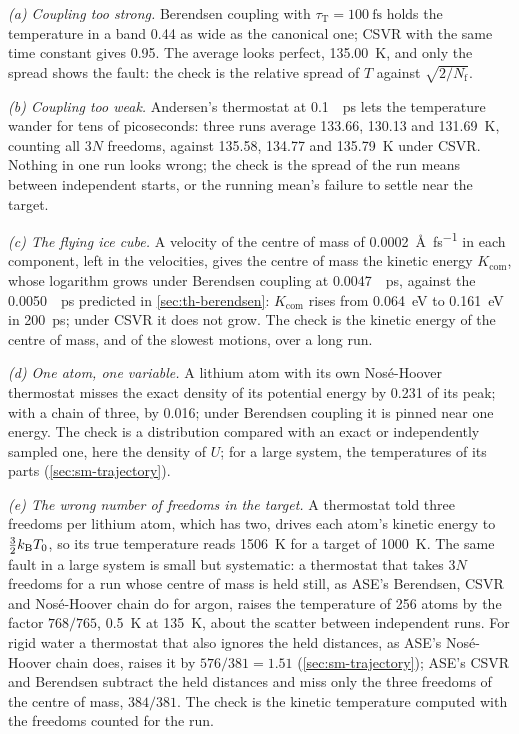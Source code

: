 \emph{(a) Coupling too strong.} Berendsen coupling with $\tau_{\mathrm T} =
\SI{100}{\femto\second}$ holds the temperature in a band 0.44 as wide as
the canonical one; CSVR with the same time constant gives 0.95. The
average looks perfect, \SI{135.00}{\kelvin}, and only the spread shows
the fault: the check is the relative spread of $T$ against
$\sqrt{2/N_{\mathrm f}}$.

\emph{(b) Coupling too weak.} Andersen's thermostat at
\SI{0.1}{\per\pico\second} lets the temperature wander for tens of
picoseconds: three runs average 133.66, 130.13 and
\SI{131.69}{\kelvin}, counting all $3N$ freedoms, against 135.58, 134.77 and \SI{135.79}{\kelvin}
under CSVR. Nothing in one run looks wrong; the check is the spread of
the run means between independent starts, or the running mean's failure
to settle near the target.

\emph{(c) The flying ice cube.} A velocity of the centre of mass of
\SI{0.0002}{\angstrom\per\femto\second} in each component, left in the
velocities, gives the centre of mass the kinetic energy $K_{\mathrm{com}}$,
whose logarithm grows under Berendsen coupling at
\SI{0.0047}{\per\pico\second}, against the \SI{0.0050}{\per\pico\second}
predicted in \cref{sec:th-berendsen}: $K_{\mathrm{com}}$ rises from
\SI{0.064}{\electronvolt} to \SI{0.161}{\electronvolt} in
\SI{200}{\pico\second}; under CSVR it does not grow. The check is the
kinetic energy of the centre of mass, and of the slowest motions, over a
long run.

\emph{(d) One atom, one variable.} A lithium atom with its own
Nosé-Hoover thermostat misses the exact density of its potential energy
by 0.231 of its peak; with a chain of three, by 0.016; under Berendsen
coupling it is pinned near one energy. The check is a distribution
compared with an exact or independently sampled one, here the density of
$U$; for a large system, the temperatures of its parts
(\cref{sec:sm-trajectory}).

\emph{(e) The wrong number of freedoms in the target.} A thermostat told
three freedoms per lithium atom, which has two, drives each atom's
kinetic energy to $\frac32k_{\mathrm{B}} T_0$, so its true temperature reads
\SI{1506}{\kelvin} for a target of \SI{1000}{\kelvin}. The same fault in
a large system is small but systematic: a thermostat that takes $3N$
freedoms for a run whose centre of mass is held still, as ASE's Berendsen, CSVR and
Nosé-Hoover chain do for argon, raises the temperature of 256 atoms by the
factor $768/765$, \SI{0.5}{\kelvin} at \SI{135}{\kelvin}, about the
scatter between independent runs. For rigid water a thermostat that also
ignores the held distances, as ASE's Nosé-Hoover chain does, raises it by
$576/381 = 1.51$ (\cref{sec:sm-trajectory}); ASE's CSVR and Berendsen
subtract the held distances and miss only the three freedoms of the centre of mass, $384/381$.
The check is the kinetic temperature computed with the freedoms counted
for the run.

